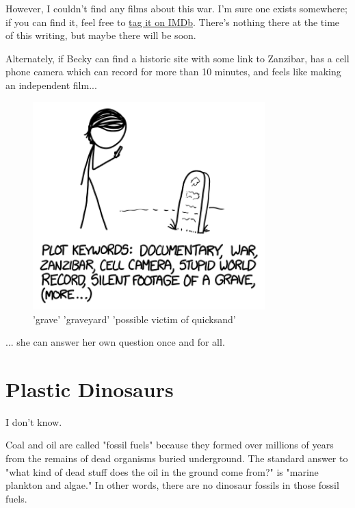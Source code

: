 {{However, I couldn't find any films about this war. I'm sure one exists somewhere; if you can find it, feel free to \href{http://www.imdb.com/keyword/anglo-zanzibar-war/}{tag it on IMDb}. There's nothing there at the time of this writing, but maybe there will be soon.}

{Alternately, if Becky can find a historic site with some link to Zanzibar, has a cell phone camera which can record for more than 10 minutes, and feels like making an independent film...}

\begin{figure}[!htbp]
\centering
\includegraphics[scale=0.5, max width=0.8\textwidth]{imgs/a/100/documentary.png}
\caption{'grave' 'graveyard' 'possible victim of quicksand'}
\end{figure}

{... she can answer her own question once and for all.}

{
\chapter{Plastic Dinosaurs}
}

\hfill{}

{I don't know.}

{Coal and oil are called "fossil fuels" because they formed over millions of years from the remains of dead organisms buried underground. The standard answer to "what kind of dead stuff does the oil in the ground come from?" is "marine plankton and algae." In other words, there are no dinosaur fossils in those fossil fuels.}

}
